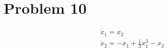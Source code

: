 \section{Problem 10}


$$
\begin{array}{l}
\dot{x}_{1}=x_{2} \\
\dot{x}_{2}=-x_{1}+\frac{1}{3} x_{1}^{3}-x_{2}
\end{array}
$$
